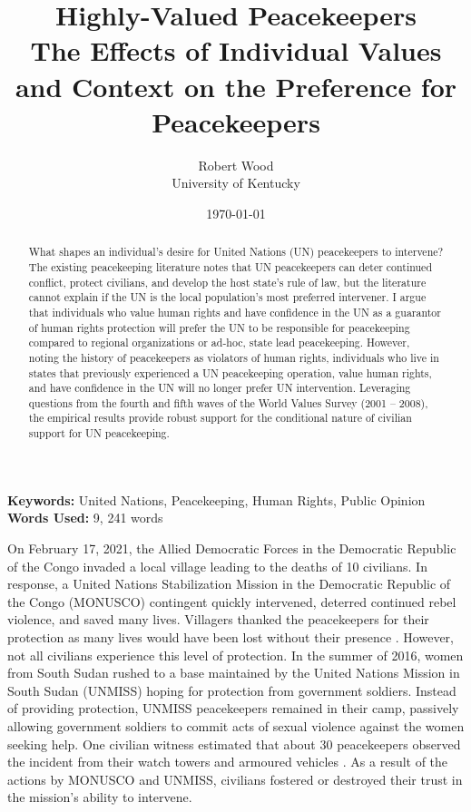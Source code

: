 \documentclass[12pt]{article}
\title{Highly-Valued Peacekeepers \\
\large The Effects of Individual Values and Context on the Preference for Peacekeepers}
\author{Robert Wood \\
University of Kentucky}
\date{\today}
\begin{document}
\begin{titlingpage}
\maketitle 

\begin{abstract}
\begin{singlespace}
What shapes an individual’s desire for United Nations (UN) peacekeepers to intervene? The existing peacekeeping literature notes that UN peacekeepers can deter continued conflict, protect civilians, and develop the host state’s rule of law, but the literature cannot explain if the UN is the local population's most preferred intervener. I argue that individuals who value human rights and have confidence in the UN as a guarantor of human rights protection will prefer the UN to be responsible for peacekeeping compared to regional organizations or ad-hoc, state lead peacekeeping. However, noting the history of peacekeepers as violators of human rights, individuals who live in states that previously experienced a UN peacekeeping operation, value human rights, and have confidence in the UN will no longer prefer UN intervention. Leveraging questions from the fourth and fifth waves of the World Values Survey (2001 – 2008), the empirical results provide robust support for the conditional nature of civilian support for UN peacekeeping.
\end{singlespace}
\end{abstract}
\begin{center}
\textbf{Keywords:} United Nations, Peacekeeping, Human Rights, Public Opinion \\
\textbf{Words Used:} 9, 241 words
\end{center}

\end{titlingpage}



\newpage

On February 17, 2021, the Allied Democratic Forces in the Democratic Republic of the Congo invaded a local village leading to the deaths of 10 civilians. In response, a United Nations Stabilization Mission in the Democratic Republic of the Congo (MONUSCO) contingent quickly intervened, deterred continued rebel violence, and saved many lives. Villagers thanked the peacekeepers for their protection as many lives would have been lost without their presence \citep{BBC_2021}. However, not all civilians experience this level of protection. In the summer of 2016, women from South Sudan rushed to a base maintained by the United Nations Mission in South Sudan (UNMISS) hoping for protection from government soldiers. Instead of providing protection, UNMISS peacekeepers remained in their camp, passively allowing government soldiers to commit acts of sexual violence against the women seeking help. One civilian witness estimated that about 30 peacekeepers observed the incident from their watch towers and armoured vehicles \citep{patinkin_2016}. As a result of the actions by MONUSCO and UNMISS, civilians fostered or destroyed their trust in the mission's ability to intervene.
\end{document}
